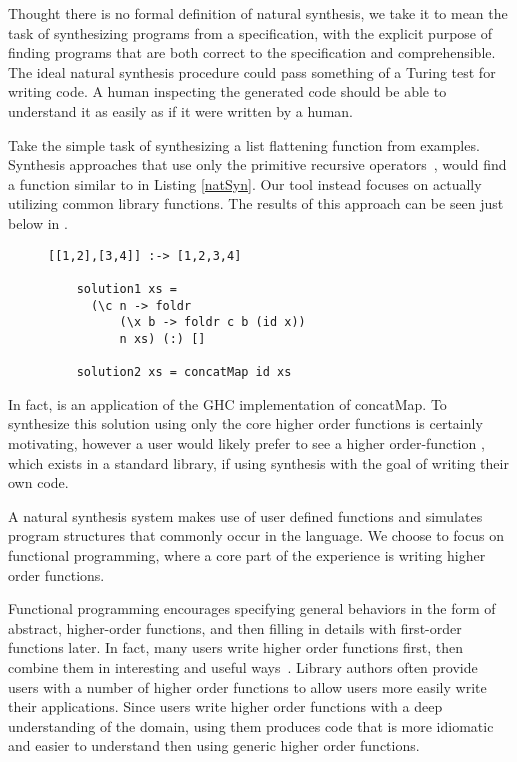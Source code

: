 Thought there is no formal definition of natural synthesis, we take it to mean the task of synthesizing programs from a specification, with the explicit purpose of finding programs that are both correct to the specification and comprehensible. The ideal natural synthesis procedure could pass something of a Turing test for writing code. A human inspecting the generated code should be able to understand it as easily as if it were written by a human.

Take the simple task of synthesizing a list flattening function from examples.  Synthesis approaches that use only the primitive recursive operators~\cite{Osera:2015,FeserCD15}, would find a function similar to  in Listing \ref{natSyn}. Our tool instead focuses on actually utilizing common library functions. The results of this approach can be seen just below in .

\begin{figure}
  \begin{lstlisting}[caption=Low-level synthesis vs. Natural synthesis,label=natSyn]
    [[1,2],[3,4]] :-> [1,2,3,4]
    
    solution1 xs = 
      (\c n -> foldr 
          (\x b -> foldr c b (id x))
          n xs) (:) []
          
    solution2 xs = concatMap id xs
    \end{lstlisting}
\end{figure}



\noindent In fact,  is an application of the GHC\cite{ghc} implementation of concatMap. To synthesize this solution using only the core higher order functions is certainly motivating, however a user would likely prefer to see a higher order-function , which exists in a standard library, if using synthesis with the goal of writing their own code.

A natural synthesis system makes use of user defined functions and simulates program structures that commonly occur in the language.  
We choose to focus on functional programming, where a core part of the experience is writing higher order functions.  

Functional programming encourages specifying general behaviors in the form of abstract, higher-order functions, and then filling in details with first-order functions later.
In fact, many users write higher order functions first, then combine them in interesting and useful ways~\cite{Lipovaca:2011}.
Library authors often provide users with a number of higher order functions to allow users more easily write their applications.
Since users write higher order functions with a deep understanding of the domain, using them produces code that is more idiomatic and easier to understand then using generic higher order functions.

